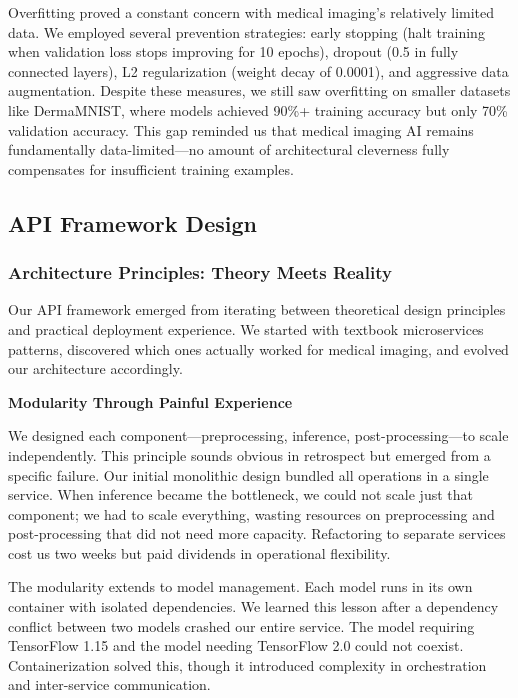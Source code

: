 \documentclass[12pt,a4paper]{article}
\begin{document}
Overfitting proved a constant concern with medical imaging's relatively limited data. We employed several prevention strategies: early stopping (halt training when validation loss stops improving for 10 epochs), dropout (0.5 in fully connected layers), L2 regularization (weight decay of 0.0001), and aggressive data augmentation. Despite these measures, we still saw overfitting on smaller datasets like DermaMNIST, where models achieved 90\%+ training accuracy but only 70\% validation accuracy. This gap reminded us that medical imaging AI remains fundamentally data-limited—no amount of architectural cleverness fully compensates for insufficient training examples.

\subsection{API Framework Design}

\subsubsection{Architecture Principles: Theory Meets Reality}

Our API framework emerged from iterating between theoretical design principles and practical deployment experience. We started with textbook microservices patterns, discovered which ones actually worked for medical imaging, and evolved our architecture accordingly.

\textbf{Modularity Through Painful Experience}

We designed each component—preprocessing, inference, post-processing—to scale independently. This principle sounds obvious in retrospect but emerged from a specific failure. Our initial monolithic design bundled all operations in a single service. When inference became the bottleneck, we could not scale just that component; we had to scale everything, wasting resources on preprocessing and post-processing that did not need more capacity. Refactoring to separate services cost us two weeks but paid dividends in operational flexibility.

The modularity extends to model management. Each model runs in its own container with isolated dependencies. We learned this lesson after a dependency conflict between two models crashed our entire service. The model requiring TensorFlow 1.15 and the model needing TensorFlow 2.0 could not coexist. Containerization solved this, though it introduced complexity in orchestration and inter-service communication.
\end{document}
